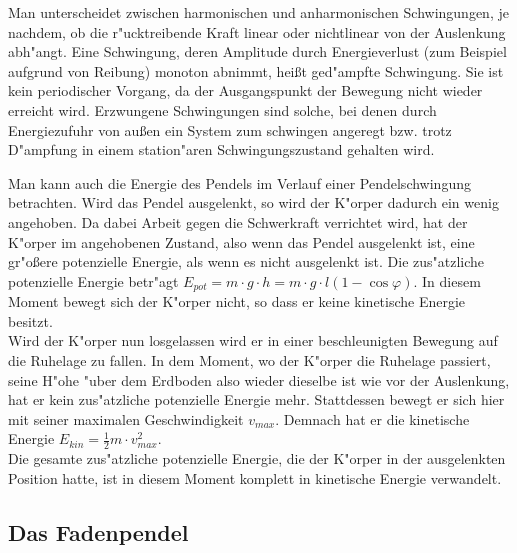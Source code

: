 %
Man unterscheidet zwischen harmonischen und anharmonischen Schwingungen, je nachdem, ob die r"ucktreibende Kraft linear oder nichtlinear von der Auslenkung abh"angt. Eine Schwingung, deren Amplitude durch Energieverlust (zum Beispiel aufgrund von Reibung) monoton abnimmt, hei{\ss}t ged"ampfte Schwingung. Sie ist kein periodischer Vorgang, da der Ausgangspunkt der Bewegung nicht wieder erreicht wird. Erzwungene Schwingungen sind solche, bei denen durch Energiezufuhr von au{\ss}en ein System zum schwingen angeregt bzw. trotz D"ampfung in einem station"aren Schwingungszustand gehalten wird.

Man kann auch die Energie des Pendels im Verlauf einer Pendelschwingung betrachten. Wird das Pendel ausgelenkt, so wird der K"orper dadurch ein wenig angehoben. Da dabei Arbeit gegen die Schwerkraft verrichtet wird, hat der K"orper im angehobenen Zustand, also wenn das Pendel ausgelenkt ist, eine gr"o{\ss}ere potenzielle Energie, als wenn es nicht ausgelenkt ist. Die zus"atzliche potenzielle Energie betr"agt $E_{pot} = m\cdot g\cdot h = m\cdot g\cdot l(1-\cos\varphi)$. In diesem Moment bewegt sich der K"orper nicht, so dass er keine kinetische Energie besitzt.\\
Wird der K"orper nun losgelassen wird er in einer beschleunigten Bewegung auf die Ruhelage zu fallen. In dem Moment, wo der K"orper die Ruhelage passiert, seine H"ohe "uber dem Erdboden also wieder dieselbe ist wie vor der Auslenkung, hat er kein zus"atzliche potenzielle Energie mehr. Stattdessen bewegt er sich hier mit seiner maximalen Geschwindigkeit $v_{max}$. Demnach hat er die kinetische Energie $E_{kin} = \frac{1}{2}m\cdot v_{max}^2$. \\
Die gesamte zus"atzliche potenzielle Energie, die der K"orper in der ausgelenkten Position hatte, ist in diesem Moment komplett in kinetische Energie verwandelt.

\subsection{Das Fadenpendel}


